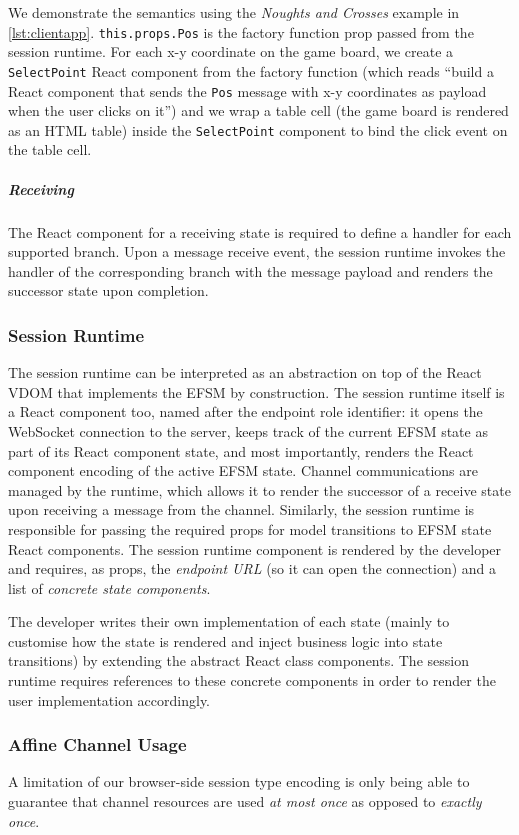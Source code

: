We demonstrate the semantics using the \textit{Noughts and Crosses} example in
\cref{lst:clientapp}.
\texttt{this.props.Pos} is the factory function prop
passed from the session runtime.
For each x-y coordinate on the game board, we
create a \texttt{SelectPoint} React component from the factory function (which
reads ``build a React component that sends the \texttt{Pos} message with x-y
coordinates as payload when the user clicks on it'') and we wrap a table cell
(the game board is rendered as an HTML table) inside the \texttt{SelectPoint}
component to bind the click event on the table cell.

\subparagraph{Receiving}
The React component for a receiving state is required to
define a handler for each supported branch. 
Upon a message receive event, the session runtime invokes the
handler of the corresponding branch with the message payload and 
renders the successor state upon completion.

\subsubsection{Session Runtime}
\label{section:clientruntime}

The session runtime can be interpreted as an abstraction on top of the React
VDOM that implements the EFSM by construction.
The session runtime itself is a React component too, named after the endpoint
role identifier:
it opens the WebSocket connection to the server, keeps track of the current
EFSM state as part of its React component state, and most importantly, renders
the React component encoding of the active EFSM state.
Channel communications are managed by the runtime, which allows it to render
the successor of a receive state upon receiving a message from the channel.
Similarly, the session runtime is responsible for passing the required props
for model transitions to EFSM state React components.
The session runtime component is rendered by the developer and requires, as
props, the \textit{endpoint URL} (so it can open the connection) and a list of
\textit{concrete state components}.

The developer writes their own implementation of each state (mainly to
customise how the state is rendered and inject business logic into state
transitions) by extending the abstract React class components.
The session runtime requires references to these concrete components in order to
render the user implementation accordingly.

\subsubsection{Affine Channel Usage}
A limitation of our browser-side session type encoding is only being able to
guarantee that channel resources are used \textit{at most once} as opposed to
\textit{exactly once}.

